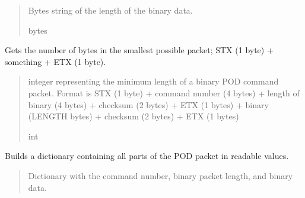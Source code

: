 \documentclass[letterpaper,10pt,english]{sphinxmanual}
\begin{document}
\begin{fulllineitems}
\begin{fulllineitems}
\begin{quote}
\begin{description}
\sphinxAtStartPar
Bytes string of the length of the binary data.

\sphinxAtStartPar
bytes

\end{description}\end{quote}

\end{fulllineitems}


\begin{fulllineitems}
\label{\detokenize{PodApi.Packets:PodApi.Packets.Binary.PacketBinary.GetMinimumLength}}
\pysigstartsignatures
{}
\pysigstopsignatures
\sphinxAtStartPar
Gets the number of bytes in the smallest possible packet;         STX (1 byte) + something + ETX (1 byte).
\begin{quote}\begin{description}
\sphinxAtStartPar
integer representing the minimum length of a binary POD                 command packet. Format is STX (1 byte) + command number (4 bytes) + length                 of binary (4 bytes) + checksum (2 bytes) + ETX (1 bytes) + binary (LENGTH                 bytes) + checksum (2 bytes) + ETX (1 bytes)

\sphinxAtStartPar
int

\end{description}\end{quote}

\end{fulllineitems}


\begin{fulllineitems}
\label{\detokenize{PodApi.Packets:PodApi.Packets.Binary.PacketBinary.TranslateAll}}
\pysigstartsignatures
{}
\pysigstopsignatures
\sphinxAtStartPar
Builds a dictionary containing all parts of the POD packet in readable values.
\begin{quote}\begin{description}
\sphinxAtStartPar
Dictionary with the command number, binary packet length,                 and binary data.


\end{description}
\end{quote}
\end{fulllineitems}
\end{fulllineitems}
\end{document}
